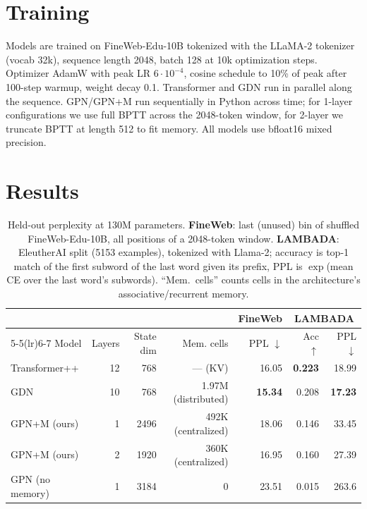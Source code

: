 \documentclass{article}
\begin{document}
\FloatBarrier

\section{Training}

Models are trained on FineWeb-Edu-10B tokenized with the LLaMA-2 tokenizer
(vocab 32k), sequence length 2048, batch 128 at 10k optimization steps.
Optimizer AdamW with peak LR $6 \cdot 10^{-4}$, cosine schedule to 10\% of
peak after 100-step warmup, weight decay 0.1. Transformer and GDN run in parallel along the sequence. GPN/GPN+M
run sequentially in Python across time; for 1-layer configurations
we use full BPTT across the 2048-token window, for 2-layer we
truncate BPTT at length 512 to fit memory. All models use bfloat16
mixed precision.

\FloatBarrier
\section{Results}
\label{sec:results}

\begin{table}[!ht]
\caption{Held-out perplexity at 130M parameters. \textbf{FineWeb}:
last (unused) bin of shuffled FineWeb-Edu-10B, all positions of a
2048-token window. \textbf{LAMBADA}: EleutherAI split (5153
examples), tokenized with Llama-2; accuracy is top-1 match of the
first subword of the last word given its prefix, PPL is $\exp$(mean
CE over the last word's subwords). ``Mem.\ cells'' counts cells in
the architecture's associative/recurrent memory.}
\label{tab:main}
\centering
\begin{tabular}{lrrrrrr}
\toprule
& & & & FineWeb & \multicolumn{2}{c}{LAMBADA} \\
\cmidrule(lr){5-5}\cmidrule(lr){6-7}
Model & Layers & State dim & Mem. cells & PPL $\downarrow$ & Acc $\uparrow$ & PPL $\downarrow$ \\
\midrule
Transformer++ & 12 & 768 & --- (KV) & 16.05 & \textbf{0.223} & 18.99 \\
GDN & 10 & 768 & 1.97M (distributed) & \textbf{15.34} & 0.208 & \textbf{17.23} \\
\midrule
GPN+M (ours) & 1 & 2496 & 492K (centralized) & 18.06 & 0.146 & 33.45 \\
GPN+M (ours) & 2 & 1920 & 360K (centralized) & 16.95 & 0.160 & 27.39 \\
GPN (no memory) & 1 & 3184 & 0 & 23.51 & 0.015 & 263.6 \\
\bottomrule
\end{tabular}
\end{table}
\end{document}
